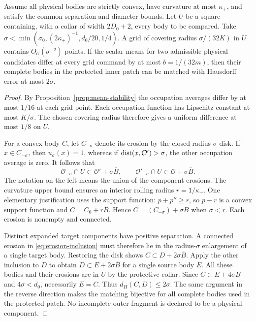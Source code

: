 \begin{lemma}
\label{lem:grid}
Assume all physical bodies are strictly convex, have curvature at most
$\kappa_+$, and satisfy the common separation and diameter bounds.
Let $U$ be a square containing, with a collar of width $2D_0+2$, every
body to be compared. Take
$\sigma<\min(\sigma_0,(2\kappa_+)^{-1},d_0/20,1/4)$.
A grid of covering radius $\sigma/(32K)$ in $U$ contains
$O_U(\sigma^{-2})$ points. If the scalar means for two admissible
physical candidates differ at every grid command by at most
$b=1/(32m)$, then their complete bodies in the protected inner patch
can be matched with Hausdorff error at most $2\sigma$.
\end{lemma}
\begin{proof}
By Proposition~\ref{prop:mean-stability} the occupation averages differ
by at most $1/16$ at each grid point. Each occupation function has
Lipschitz constant at most $K/\sigma$. The chosen covering radius
therefore gives a uniform difference at most $1/8$ on $U$.

For a convex body $C$, let $C_{-\sigma}$ denote its erosion by the
closed radius-$\sigma$ disk. If $x\in C_{-\sigma}$, then
$u_\sigma(x)=1$, whereas if $\operatorname{dist}(x,\mathcal O')>\sigma$, the other
occupation average is zero. It follows that
\begin{equation}\label{eq:erosion-inclusion}
 \mathcal O_{-\sigma}\cap U\subset\mathcal O'+\sigma\overline B,
 \qquad
 \mathcal O'_{-\sigma}\cap U\subset\mathcal O+\sigma\overline B.
\end{equation}
The notation on the left means the union of the component erosions.
The curvature upper bound ensures an interior rolling radius
$r=1/\kappa_+$. One elementary justification uses the support function:
$p+p''\ge r$, so $p-r$ is a convex support function and
$C=C_0+r\overline B$. Hence
$C=(C_{-\sigma})+\sigma\overline B$ when $\sigma<r$.
Each erosion is nonempty and connected.

Distinct expanded target components have positive separation. A
connected erosion in \eqref{eq:erosion-inclusion} must therefore lie
in the radius-$\sigma$ enlargement of a single target body. Restoring
the disk shows $C\subset D+2\sigma\overline B$. Apply the other
inclusion to $D$ to obtain $D\subset E+2\sigma\overline B$ for a
single source body $E$. All these bodies and their erosions are in $U$
by the protective collar. Since $C\subset E+4\sigma\overline B$ and
$4\sigma<d_0$, necessarily $E=C$. Thus $d_H(C,D)\le2\sigma$.
The same argument in the reverse direction makes the matching bijective
for all complete bodies used in the protected patch. No incomplete
outer fragment is declared to be a physical component.
\end{proof}

